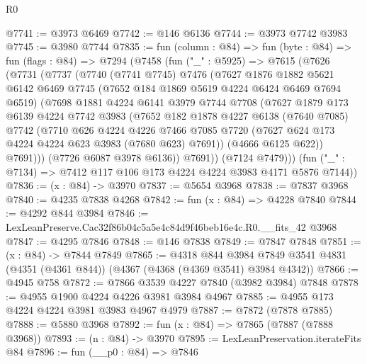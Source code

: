 \begin{lexlean}{R0}
\begin{coremodule}
@7741 := @3973 @6469
@7742 := @146 @6136
@7744 := @3973 @7742 @3983
@7745 := @3980 @7744
@7835 := fun (column : @84) =>
  fun (byte : @84) =>
  fun (flags : @84) =>
  @7294
    (@7458
      (fun ("_" : @5925) =>
      @7615
        (@7626
          (@7731
            (@7737
              (@7740
                (@7741 @7745)
                @7476
                (@7627
                  @1876
                  @1882
                  @5621
                  @6142
                  @6469
                  @7745
                  (@7652 @184 @1869 @5619 @4224 @6424 @6469 @7694 @6519)
                  (@7698
                    @1881
                    @4224
                    @6141
                    @3979
                    @7744
                    @7708
                    (@7627
                      @1879
                      @173
                      @6139
                      @4224
                      @7742
                      @3983
                      (@7652
                        @182
                        @1878
                        @4227
                        @6138
                        (@7640 @7085)
                        @7742
                        (@7710
                          @626
                          @4224
                          @4226
                          @7466
                          @7085
                          @7720
                          (@7627 @624 @173 @4224 @4224 @623 @3983 (@7680 @623) @7691))
                        (@4666 @6125 @622))
                      @7691)))
                (@7726 @6087 @3978 @6136))
              @7691))
          (@7124 @7479)))
      (fun ("_" : @7134) => @7412 @117 @106 @173 @4224 @4224 @3983 @4171 @5876 @7144))
@7836 := (x : @84) -> @3970
@7837 := @5654 @3968
@7838 := @7837 @3968
@7840 := @4235 @7838 @4268
@7842 := fun (x : @84) => @4228 @7840
@7844 := @4292 @844 @3984
@7846 := LexLeanPreserve.Cac32f86b04c5a5e4c84d9f46beb16e4c.R0.__fits_42 @3968
@7847 := @4295 @7846
@7848 := @146 @7838
@7849 := @7847 @7848
@7851 := (x : @84) -> @7844 @7849
@7865 := @4318
    @844
    @3984
    @7849
    @3541
    @4831
    (@4351 (@4361 @844))
    (@4367 (@4368 (@4369 @3541) @3984 @4342))
@7866 := @4945 @758
@7872 := @7866 @3539 @4227 @7840 (@3982 @3984) @7848
@7878 := @4955 @1900 @4224 @4226 @3981 @3984 @4967
@7885 := @4955 @173 @4224 @4224 @3981 @3983 @4967 @4979
@7887 := @7872 (@7878 @7885)
@7888 := @5880 @3968
@7892 := fun (x : @84) => @7865 (@7887 (@7888 @3968))
@7893 := (n : @84) -> @3970
@7895 := LexLeanPreservation.iterateFits @84
@7896 := fun (__p0 : @84) => @7846

\end{coremodule}
\end{lexlean}
